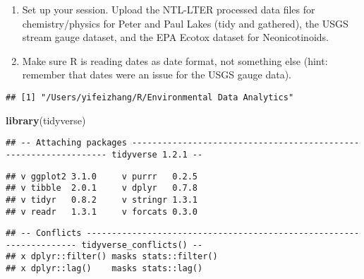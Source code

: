 \documentclass[]{article}
\newenvironment{Shaded}{\begin{snugshade}}{\end{snugshade}}
\newcommand{\KeywordTok}[1]{\textcolor[rgb]{0.13,0.29,0.53}{\textbf{#1}}}
\newcommand{\CommentTok}[1]{\textcolor[rgb]{0.56,0.35,0.01}{\textit{#1}}}
\newcommand{\NormalTok}[1]{#1}
\begin{document}
\begin{enumerate}
\def\labelenumi{\arabic{enumi}.}
\item
  Set up your session. Upload the NTL-LTER processed data files for
  chemistry/physics for Peter and Paul Lakes (tidy and gathered), the
  USGS stream gauge dataset, and the EPA Ecotox dataset for
  Neonicotinoids.
\item
  Make sure R is reading dates as date format, not something else (hint:
  remember that dates were an issue for the USGS gauge data).
\end{enumerate}

\begin{Shaded}
\end{Shaded}

\begin{verbatim}
## [1] "/Users/yifeizhang/R/Environmental Data Analytics"
\end{verbatim}

\begin{Shaded}
\begin{Highlighting}[]
\KeywordTok{library}\NormalTok{(tidyverse)}
\end{Highlighting}
\end{Shaded}

\begin{verbatim}
## -- Attaching packages ----------------------------------------------------------------- tidyverse 1.2.1 --
\end{verbatim}

\begin{verbatim}
## v ggplot2 3.1.0     v purrr   0.2.5
## v tibble  2.0.1     v dplyr   0.7.8
## v tidyr   0.8.2     v stringr 1.3.1
## v readr   1.3.1     v forcats 0.3.0
\end{verbatim}

\begin{verbatim}
## -- Conflicts -------------------------------------------------------------------- tidyverse_conflicts() --
## x dplyr::filter() masks stats::filter()
## x dplyr::lag()    masks stats::lag()
\end{verbatim}
\end{document}
